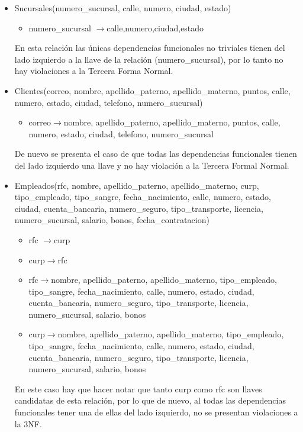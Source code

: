 \documentclass[11pt]{article}
\begin{document}
\begin{itemize}
\item Sucursales(numero\_sucursal, calle, numero, ciudad, estado)
      \begin{itemize}
        \item numero\_sucursal $\rightarrow$calle,numero,ciudad,estado
      \end{itemize}
      En esta relación las únicas dependencias funcionales no triviales tienen del lado izquierdo a la llave de la relación (numero\_sucursal), por lo tanto no hay violaciones a la Tercera Forma Normal.
\item Clientes(correo, nombre, apellido\_paterno, apellido\_materno, puntos, calle, numero, estado, ciudad, telefono, numero\_sucursal) 
      \begin{itemize}
        \item correo$\rightarrow$nombre, apellido\_paterno, apellido\_materno, puntos, calle, numero, estado, ciudad, telefono, numero\_sucursal
      \end{itemize}
      De nuevo se presenta el caso de que todas las dependencias funcionales tienen del lado izquierdo una llave y no hay violación a la Tercera Formal Normal.
\item Empleados(rfc, nombre, apellido\_paterno, apellido\_materno, curp,  tipo\_empleado, tipo\_sangre, fecha\_nacimiento, calle, numero, estado, ciudad, cuenta\_bancaria, numero\_seguro, tipo\_transporte, licencia, numero\_sucursal, salario, bonos, fecha\_contratacion)
      \begin{itemize}
        \item rfc $\rightarrow$curp
        \item curp$\rightarrow$rfc
        \item rfc$\rightarrow$nombre, apellido\_paterno, apellido\_materno, tipo\_empleado, tipo\_sangre, fecha\_nacimiento, calle, numero, estado, ciudad, cuenta\_bancaria, numero\_seguro, tipo\_transporte, licencia, numero\_sucursal, salario, bonos
        \item curp$\rightarrow$nombre, apellido\_paterno, apellido\_materno, tipo\_empleado, tipo\_sangre, fecha\_nacimiento, calle, numero, estado, ciudad, cuenta\_bancaria, numero\_seguro, tipo\_transporte, licencia, numero\_sucursal, salario, bonos
      \end{itemize}
      En este caso hay que hacer notar que tanto curp como rfc son llaves candidatas de esta relación, por lo que de nuevo, al todas las dependencias funcionales tener una de ellas del lado izquierdo, no se presentan violaciones a la 3NF.

\end{itemize}
\end{document}
